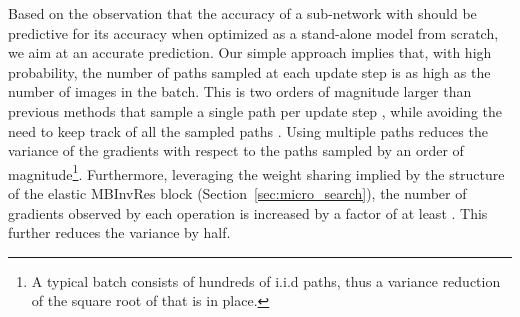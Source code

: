 \documentclass[dvipsnames,table,xcdraw]{article}
\begin{document}
Based on the observation that the accuracy of a sub-network with  should be predictive for its accuracy when optimized as a stand-alone model from scratch, we aim at an accurate prediction.
Our simple approach implies that, with high probability, the number of paths sampled at each update step is as high as the number of images in the batch. This is two orders of magnitude larger than previous methods that sample a single path per update step \cite{SPOS, OFA}, while avoiding the need to keep track of all the sampled paths \cite{fairnas}. Using multiple paths reduces the variance of the gradients with respect to the paths sampled by an order of magnitude\footnote{A typical batch consists of hundreds of i.i.d paths, thus a variance reduction of the square root of that is in place.}. Furthermore, leveraging the weight sharing implied by the structure of the elastic MBInvRes block (Section~\ref{sec:micro_search}), the number of gradients observed by each operation is increased by a factor of at least . This further reduces the variance by half. 
\end{document}
